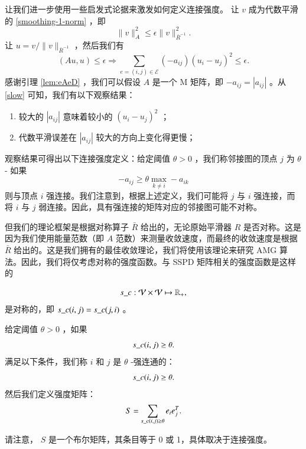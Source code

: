 \documentclass[12pt]{acta_2011xz}
\begin{document}
让我们进一步使用一些启发式论据来激发如何定义连接强度。 让    $v$    成为代数平滑的    \eqref{smoothing-1-norm}    ，即
   $$
\|v\|_A^2\le\epsilon \|v\|_{\bar R^{-1}}^2.
$$    让    $u=v/\|v\|_{\bar R^{-1}}$    ，然后我们有
   \begin{equation}
  \label{slow}
(Au,u) \le\epsilon\Rightarrow \sum_{e=(i,j)\in \mathcal{E}}
(-a_{ij})(u_i-u_j)^2\le \epsilon.
\end{equation}    感谢引理    \ref{lem:eAeD}    ，我们可以假设    $A$    是一个 M 矩阵，即    $-a_{ij}=|a_{ij}|$    。从    \eqref{slow}    可知，我们有以下观察结果：
   \begin{enumerate}

   \item   较大的    $|a_{ij}|$    意味着较小的    $(u_i-u_j)^2$   ；   \item   代数平滑误差在    $|a_{ij}|$    较大的方向上变化得更慢；  \end{enumerate}    观察结果可得出以下连接强度定义：给定阈值    $\theta>0$    ，我们称邻接图的顶点    $j$    为    $\theta$    - 如果
   \begin{equation}\label{classical-strength}
-a_{ij}\geq\theta\max_{k\neq i}-a_{ik}
\end{equation}    则与顶点
   $i$    强连接。我们注意到，根据上述定义，我们可能将    $j$    与    $i$    强连接，而将    $i$    与    $j$    弱连接。因此，具有强连接的矩阵对应的邻接图可能不对称。  

但我们的理论框架是根据对称算子    $\bar R$    给出的，无论原始平滑器    $R$    是否对称。这是因为我们使用能量范数（即    $A$    范数）来测量收敛速度，而最终的收敛速度是根据    $\bar R$    给出的。这是我们拥有的最佳收敛理论，我们将使用该理论来研究 AMG 算法。因此，我们将仅考虑对称的强度函数。与 SSPD 矩阵相关的强度函数是这样的  

   \begin{equation}
  \label{sc-vertices}
s\_c : \mathcal V\times\mathcal V\mapsto \mathbb R_{+},
\end{equation}    是对称的，即    $s\_c(i,j)=s\_c(j,i)$    。  

给定阈值    $\theta>0$    ，如果    $$
s\_c(i,j)
\ge \theta.
$$    满足以下条件，我们称    $i$    和    $j$    是    $\theta$    -强连通的：
   $$
s\_c(i,j)
\ge \theta.
$$    然后我们定义强度矩阵：
   \begin{equation}\label{defS}
S=\sum_{s\_c(i,j)\ge\theta} e_ie_j^T.
\end{equation}     

请注意，   $S$    是一个布尔矩阵，其条目等于 0 或 1，具体取决于连接强度。  
\end{document}

